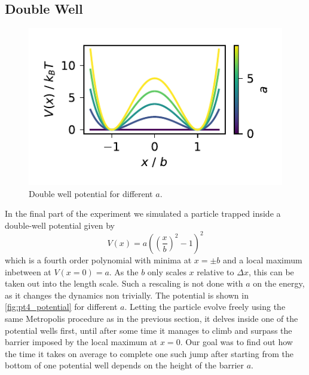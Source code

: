 \documentclass[
    parskip=half, 
    twoside=false,
    twocolumn=true,
    fontsize=11pt,
]{scrarticle}
\begin{document}
\subsection{Double Well}
\begin{figure}
    \centering
    \includegraphics{figures/04 potential.pdf}
    \caption{Double well potential for different $a$.}
    \label{fig:pt4_potential}
\end{figure}
In the final part of the experiment we simulated a particle trapped inside a double-well potential given by
$$V(x) = a\left(\left(\frac{x}{b}\right)^2-1\right)^2$$
which is a fourth order polynomial with minima at $x=\pm b$ and a local maximum inbetween at $V(x=0)=a$.
As the $b$ only scales $x$ relative to $\Delta x$, this can be taken out into the length scale.
Such a rescaling is not done with $a$ on the energy, as it changes the dynamics non trivially.
The potential is shown in \autoref{fig:pt4_potential} for different $a$.
Letting the particle evolve freely using the same Metropolis procedure as in the previous section, it delves inside one of the potential wells first, until after some time it manages to climb and surpass the barrier imposed by the local maximum at $x=0$. 
Our goal was to find out how the time it takes on average to complete one such jump after starting from the bottom of one potential well depends on the height of the barrier $a$.
\end{document}

